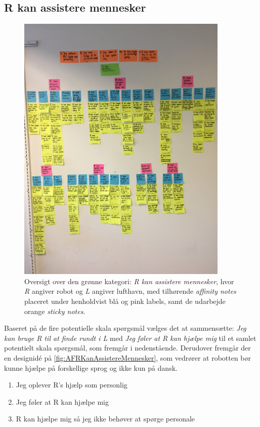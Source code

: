 \subsection{R kan assistere mennesker}
\label{ParametreRKanAssistereMennesker}
%
\begin{figure}[H]
\centering
\includegraphics[width = 0.9\textwidth]{Figure/AffinityDiagram/RKanAssistereMennesker} 
\caption{Oversigt over den grønne kategori: \textit{R kan assistere mennesker}, hvor \textit{R} angiver robot og \textit{L} angiver lufthavn, med tilhørende \textit{affinity notes} placeret under henholdvist blå og pink labels, samt de udarbejde orange \textit{sticky notes}.}
\label{fig:AFRKanAssistereMennesker}
\end{figure}
\noindent
%
Baseret på de fire potentielle skala spørgsmål vælges det at sammensætte: \textit{Jeg kan bruge R til at finde rundt i L} med \textit{Jeg føler at R kan hjælpe mig} til et samlet potentielt skala spørgsmål, som fremgår i nedenstående. Derudover fremgår der en designidé på \autoref{fig:AFRKanAssistereMennesker}, som vedrører at robotten bør kunne hjælpe på forskellige sprog og ikke kun på dansk.\blankline 
%
\begin{enumerate}
  \item Jeg oplever R's hjælp som personlig
  \item Jeg føler at R kan hjælpe mig
  \item R kan hjælpe mig så jeg ikke behøver at spørge personale\blankline
\end{enumerate}
